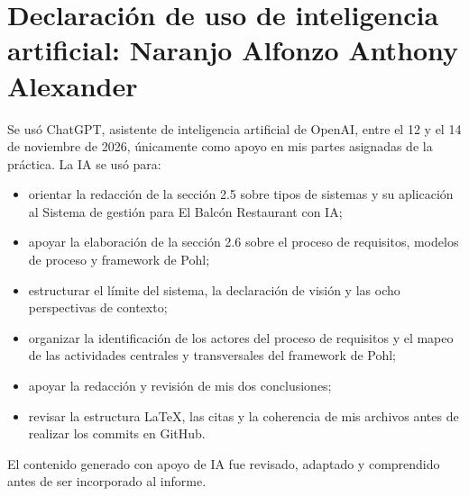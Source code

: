 \section*{Declaración de uso de inteligencia artificial: Naranjo Alfonzo Anthony Alexander}

Se usó ChatGPT, asistente de inteligencia artificial de OpenAI, entre el 12 y el 14 de noviembre de 2026, únicamente como apoyo en mis partes asignadas de la práctica. La IA se usó para:

\begin{itemize}
  \item orientar la redacción de la sección 2.5 sobre tipos de sistemas y su aplicación al Sistema de gestión para El Balcón Restaurant con IA;
  \item apoyar la elaboración de la sección 2.6 sobre el proceso de requisitos, modelos de proceso y framework de Pohl;
  \item estructurar el límite del sistema, la declaración de visión y las ocho perspectivas de contexto;
  \item organizar la identificación de los actores del proceso de requisitos y el mapeo de las actividades centrales y transversales del framework de Pohl;
  \item apoyar la redacción y revisión de mis dos conclusiones;
  \item revisar la estructura LaTeX, las citas y la coherencia de mis archivos antes de realizar los commits en GitHub.
\end{itemize}

El contenido generado con apoyo de IA fue revisado, adaptado y comprendido antes de ser incorporado al informe.
